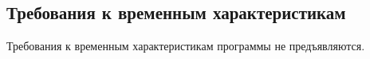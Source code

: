 \subsection{Требования к временным характеристикам}
Требования к временным характеристикам программы не предъявляются.




